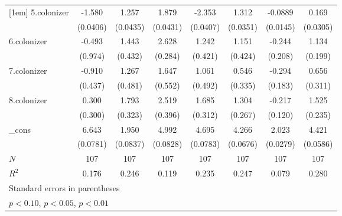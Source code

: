 {\begin{tabular}{l*{7}{c}}
[1em]
5.colonizer &      -1.580\sym{***}&       1.257\sym{***}&       1.879\sym{***}&      -2.353\sym{***}&       1.312\sym{***}&     -0.0889\sym{***}&       0.169\sym{***}\\
            &    (0.0406)         &    (0.0435)         &    (0.0431)         &    (0.0407)         &    (0.0351)         &    (0.0145)         &    (0.0305)         \\
[1em]
6.colonizer &      -0.493         &       1.443\sym{***}&       2.628\sym{***}&       1.242\sym{***}&       1.151\sym{***}&      -0.244         &       1.134\sym{***}\\
            &     (0.974)         &     (0.432)         &     (0.284)         &     (0.421)         &     (0.424)         &     (0.208)         &     (0.199)         \\
[1em]
7.colonizer &      -0.910\sym{**} &       1.267\sym{***}&       1.647\sym{***}&       1.061\sym{**} &       0.546         &      -0.294         &       0.656\sym{**} \\
            &     (0.437)         &     (0.481)         &     (0.552)         &     (0.492)         &     (0.335)         &     (0.183)         &     (0.311)         \\
[1em]
8.colonizer &       0.300         &       1.793\sym{***}&       2.519\sym{***}&       1.685\sym{***}&       1.304\sym{***}&      -0.217\sym{*}  &       1.525\sym{***}\\
            &     (0.300)         &     (0.323)         &     (0.396)         &     (0.312)         &     (0.267)         &     (0.120)         &     (0.235)         \\
[1em]
\_cons      &       6.643\sym{***}&       1.950\sym{***}&       4.992\sym{***}&       4.695\sym{***}&       4.266\sym{***}&       2.023\sym{***}&       4.421\sym{***}\\
            &    (0.0781)         &    (0.0837)         &    (0.0828)         &    (0.0783)         &    (0.0676)         &    (0.0279)         &    (0.0586)         \\
\hline
\(N\)       &         107         &         107         &         107         &         107         &         107         &         107         &         107         \\
\(R^{2}\)   &       0.176         &       0.246         &       0.119         &       0.235         &       0.247         &       0.079         &       0.280         \\
\hline\hline
\multicolumn{8}{l}{\footnotesize Standard errors in parentheses}\\
\multicolumn{8}{l}{\footnotesize \sym{*} \(p<0.10\), \sym{**} \(p<0.05\), \sym{***} \(p<0.01\)}\\
\end{tabular}
}
